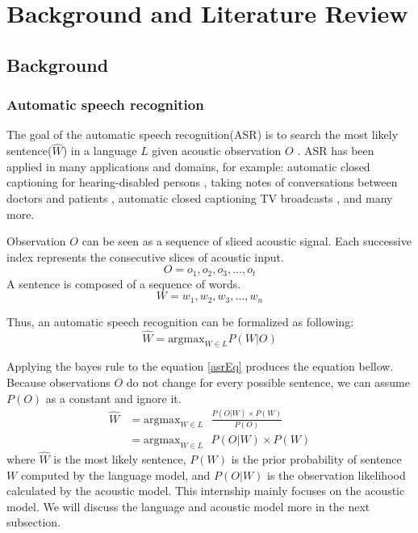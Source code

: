 \chapter{Background and Literature Review}

\section{Background}
\subsection{Automatic speech recognition}
The goal of the automatic speech recognition(ASR) is to search the most likely sentence($\hat{W}$) in a language $L$ given acoustic observation $O$ \cite{Jurafsky:2009:SLP:1214993}. ASR has been applied in many applications and domains, for example: automatic closed captioning for hearing-disabled persons \cite{Patel2010}, taking notes of conversations between doctors and patients \cite{Klann2008}, automatic closed captioning TV broadcasts \cite{Woodland2015}, and many more.

Observation $O$ can be seen as a sequence of sliced acoustic signal. Each successive index represents the consecutive slices of acoustic input.
\begin{equation}
O=o_{1},o_{2},o_{3},...,o_{t}
\end{equation} 
A sentence is composed of a sequence of words.
\begin{equation}
W = w_{1},w_{2},w_{3},...,w_{n}
\end{equation}


Thus, an automatic speech recognition can be formalized as following:
\begin{equation}
\label{asrEq}
\hat{W} = \textrm{argmax}_{W \in L} P(W|O)
\end{equation}

Applying the bayes rule to the equation \ref{asrEq} produces the equation bellow. Because observations $O$ do not change for every possible sentence, we can assume $P(O)$ as a constant and ignore it.
\begin{align}
\hat{W} & = \textrm{argmax}_{W \in L} \textrm{ } \frac{P(O|W) \times P(W)}{P(O)} \\
	& = \textrm{argmax}_{W \in L} \textrm{ } P(O|W) \times P(W)
\end{align}
where $\hat{W}$ is the most likely sentence, $P(W)$ is the prior probability of sentence $W$ computed by the language model, and $P(O|W)$ is the observation likelihood calculated by the acoustic model. This internship mainly focuses on the acoustic model. We will discuss the language and acoustic model more in the next subsection. 



